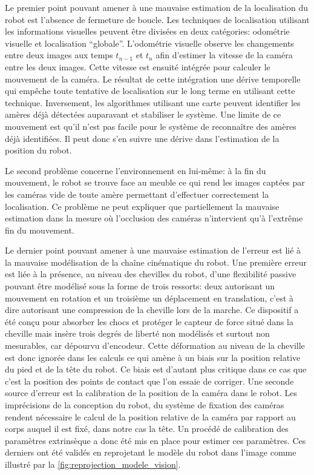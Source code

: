 Le premier point pouvant amener à une mauvaise estimation de la
localisation du robot est l'absence de fermeture de boucle. Les
techniques de localisation utilisant les informations visuelles
peuvent être divisées en deux catégories: odométrie
visuelle et localisation
``globale''. L'odométrie visuelle observe les changements entre deux
images aux temps $t_{n-1}$ et $t_n$ afin d'estimer la vitesse de la
caméra entre les deux images. Cette vitesse est ensuité intégrée pour
calculer le mouvement de la caméra. Le résultat de cette intégration
une dérive temporelle qui empêche toute tentative de localisation sur
le long terme en utilisant cette technique. Inversement, les
algorithmes utilisant une carte peuvent identifier les amères déjà
détectées auparavant et stabiliser le système. Une limite de ce
mouvement est qu'il n'est pas facile pour le système de reconnaître
des amères déjà identifiées. Il peut donc s'en suivre une dérive dans
l'estimation de la position du robot.


Le second problème concerne l'environnement en lui-même: à la fin du
mouvement, le robot se trouve face au meuble ce qui rend les images
captées par les caméras vide de toute amère permettant d'effectuer
correctement la localisation. Ce problème ne peut expliquer que
partiellement la mauvaise estimation dans la mesure où l'occlusion des
caméras n'intervient qu'à l'extrême fin du mouvement.


Le dernier point pouvant amener à une mauvaise estimation de l'erreur
est lié à la mauvaise modélisation de la chaîne cinématique du
robot. Une première erreur est liée à la présence, au niveau des
chevilles du robot, d'une flexibilité passive pouvant être modélisé
sous la forme de trois ressorts: deux autorisant un mouvement en
rotation et un troisième un déplacement en translation, c'est à dire
autorisant une compression de la cheville lors de la marche. Ce
dispositif a été conçu pour absorber les chocs et protéger le capteur
de force situé dans la cheville mais insère trois degrés de liberté
non modélisés et surtout non mesurables, car dépourvu
d'encodeur. Cette déformation au niveau de la cheville est donc
ignorée dans les calculs ce qui amène à un biais sur la position
relative du pied et de la tête du robot. Ce biais est d'autant plus
critique dans ce cas que c'est la position des points de contact que
l'on essaie de corriger. Une seconde source d'erreur est la
calibration de la position de la caméra dans le robot. Les
imprécisions de la conception du robot, du système de fixation des
caméras rendent nécessaire le calcul de la position relative de la
caméra par rapport au corps auquel il est fixé, dans notre cas la
tête. Un procédé de calibration des paramètres
extrinsèque a donc été
mis en place pour estimer ces paramètres. Ces derniers ont été validés
en reprojetant le modèle du robot dans l'image comme illustré par la
\autoref{fig:reprojection_modele_vision}.


